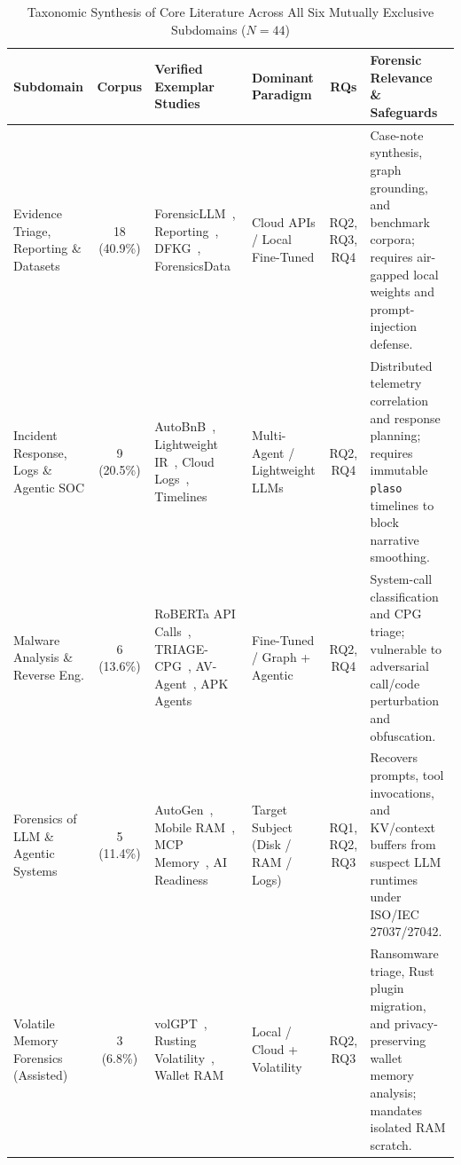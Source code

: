 \begin{table}[!t]
\caption{Taxonomic Synthesis of Core Literature Across All Six Mutually Exclusive Subdomains ($N=44$)}
\label{tab:taxonomy_summary}
\centering
\scriptsize
\setlength{\tabcolsep}{3pt}
\begin{tabular}{p{2.2cm}cp{3.7cm}p{2.1cm}cp{3.9cm}}
\toprule
\textbf{Subdomain} & \textbf{Corpus} & \textbf{Verified Exemplar Studies} & \textbf{Dominant Paradigm} & \textbf{RQs} & \textbf{Forensic Relevance \& Safeguards} \\
\midrule
Evidence Triage, Reporting \& Datasets & 18 (40.9\%) & ForensicLLM~\cite{sharma2025_forensicllm}, Reporting~\cite{michelet2024_chatgpt}, DFKG~\cite{khatiwala2025_evaluating}, ForensicsData~\cite{chakir2025_forensicsdata} & Cloud APIs / Local Fine-Tuned & RQ2, RQ3, RQ4 & Case-note synthesis, graph grounding, and benchmark corpora; requires air-gapped local weights and prompt-injection defense. \\
\addlinespace
Incident Response, Logs \& Agentic SOC & 9 (20.5\%) & AutoBnB~\cite{liu2025_autobnb}, Lightweight IR~\cite{hammar2026_incident}, Cloud Logs~\cite{alharthi2025_llmpowered}, Timelines~\cite{studiawan2025_towards} & Multi-Agent / Lightweight LLMs & RQ2, RQ4 & Distributed telemetry correlation and response planning; requires immutable \texttt{plaso} timelines to block narrative smoothing. \\
\addlinespace
Malware Analysis \& Reverse Eng. & 6 (13.6\%) & RoBERTa API Calls~\cite{clark2025_large}, TRIAGE-CPG~\cite{sava2026_triagecpg}, AV-Agent~\cite{zheng2025_avagent}, APK Agents~\cite{ozyurt2026_llmorchestrated} & Fine-Tuned / Graph + Agentic & RQ2, RQ4 & System-call classification and CPG triage; vulnerable to adversarial call/code perturbation and obfuscation. \\
\addlinespace
Forensics of LLM \& Agentic Systems & 5 (11.4\%) & AutoGen~\cite{walker2024_forensic}, Mobile RAM~\cite{xu2026_recovering}, MCP Memory~\cite{satter2026_with}, AI Readiness~\cite{scanlon2026_investigation} & Target Subject (Disk / RAM / Logs) & RQ1, RQ2, RQ3 & Recovers prompts, tool invocations, and KV/context buffers from suspect LLM runtimes under ISO/IEC 27037/27042. \\
\addlinespace
Volatile Memory Forensics (Assisted) & 3 (6.8\%) & volGPT~\cite{oh2024_volgpt}, Rusting Volatility~\cite{gharaibeh2026_rusting}, Wallet RAM~\cite{kao2026_a} & Local / Cloud + Volatility & RQ2, RQ3 & Ransomware triage, Rust plugin migration, and privacy-preserving wallet memory analysis; mandates isolated RAM scratch. \\

\end{tabular}
\end{table}
